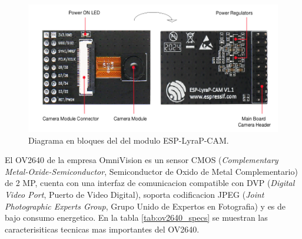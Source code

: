 \begin{figure}[h]
	\centering
	\includegraphics[scale=0.5]{./Figures/camera_blocks.png}
	\caption{Diagrama en bloques del del modulo ESP-LyraP-CAM.}
	\label{fig:camera_blocks}
\end{figure}

El OV2640 de la empresa OmniVision es un sensor CMOS (\textit{Complementary Metal-Oxide-Semiconductor}, Semiconductor de Oxido de Metal Complementario) de 2 MP, cuenta con una interfaz de comunicacion compatible con DVP  (\textit{Digital Video Port}, Puerto de Video Digital), soporta codificacion JPEG (\textit{Joint Photographic Experts Group}, Grupo Unido de Expertos en Fotografia) y es de bajo consumo energetico. En la tabla \ref{tab:ov2640_specs} se muestran las caracterisiticas tecnicas mas importantes del OV2640.

